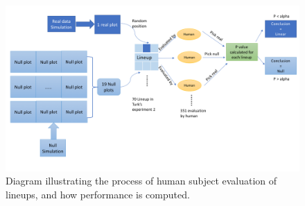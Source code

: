 \documentclass[12pt]{article}
\begin{document}
\begin{figure}[h]
\centerline{\includegraphics[width=15cm]{figures/diaghm.png}}
\caption{Diagram illustrating the process of human subject evaluation of lineups, and how performance is computed.}
\label{dghm}
\end{figure}



\end{document}
